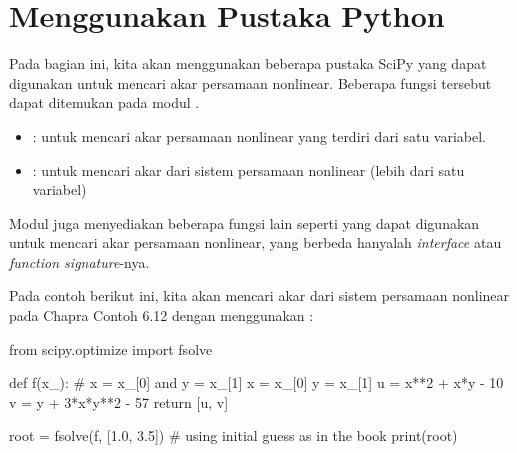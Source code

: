\section{Menggunakan Pustaka Python}

Pada bagian ini, kita akan menggunakan beberapa pustaka SciPy yang dapat digunakan
untuk mencari akar persamaan nonlinear. Beberapa fungsi tersebut dapat ditemukan
pada modul .

\begin{itemize}
\item {}: untuk mencari akar persamaan nonlinear
yang terdiri dari satu variabel.
\item {}: untuk mencari akar dari sistem persamaan
nonlinear (lebih dari satu variabel)
\end{itemize}


%    
%    
%    
%    
%    
%

Modul  juga menyediakan beberapa fungsi lain seperti
 yang dapat digunakan untuk mencari akar persamaan
nonlinear, yang berbeda hanyalah \textit{interface} atau
\textit{function signature}-nya.

Pada contoh berikut ini, kita akan mencari akar dari sistem persamaan nonlinear
pada Chapra Contoh 6.12 dengan menggunakan :

\begin{fullwidth}
\begin{pythoncode}
from scipy.optimize import fsolve

def f(x_):
    # x = x_[0] and y = x_[1] 
    x = x_[0]
    y = x_[1]
    u = x**2 + x*y - 10
    v = y + 3*x*y**2 - 57
    return [u, v]
    
root = fsolve(f, [1.0, 3.5]) # using initial guess as in the book
print(root)
\end{pythoncode}
\end{fullwidth}

